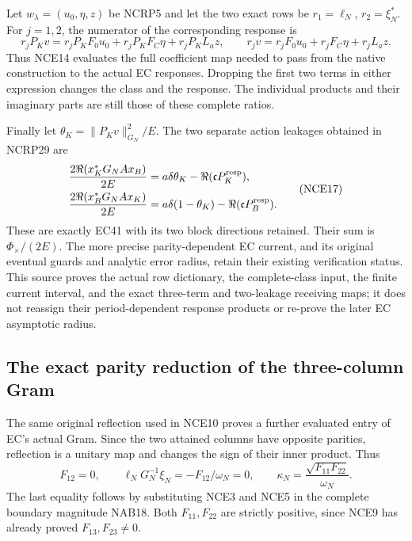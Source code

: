 Let $w_\lambda=(u_0,\eta,z)$ be NCRP5 and let the two exact rows be
$r_1=\ell_N$, $r_2=\xi_N^*$.
For $j=1,2$, the numerator of the corresponding response is
\[
 r_jP_Kv
    =r_jP_KF_0u_0+r_jP_KF_C\eta+r_jP_KL_az,
 \qquad
 r_jv=r_jF_0u_0+r_jF_C\eta+r_jL_az .
 \tag{NCE16}
\]
Thus NCE14 evaluates the full coefficient map needed to pass from
the native construction to the actual EC responses. Dropping the
first two terms in either expression changes the class and the
response. The individual products and their imaginary parts are
still those of these complete ratios.

Finally let $\theta_K=\|P_Kv\|_{G_N}^2/E$. The two separate action
leakages obtained in NCRP29 are
\[
 \begin{split}
 \frac{2\Re(x_K^*G_NAx_B)}{2E}
       &=a\delta\theta_K-\Re(\mathfrak c P_K^{\rm resp}),\\
 \frac{2\Re(x_B^*G_NAx_K)}{2E}
       &=a\delta(1-\theta_K)-\Re(\mathfrak c P_B^{\rm resp}).
 \end{split}                                                     \tag{NCE17}
\]
These are exactly EC41 with its two block directions retained.
Their sum is $\Phi_\times/(2E)$.
The more precise parity-dependent EC current, and its original
eventual guards and analytic error radius, retain their existing
verification status. This source proves the actual row dictionary,
the complete-class input, the finite current interval, and the
exact three-term and two-leakage receiving maps; it does not
reassign their period-dependent response products or re-prove
the later EC asymptotic radius.

\subsection{The exact parity reduction of the three-column Gram}

The same original reflection used in NCE10 proves a further evaluated
entry of EC's actual Gram. Since the two attained columns have opposite
parities, reflection is a unitary map and changes the sign of their
inner product. Thus
\[
 F_{12}=0,\qquad
 \ell_NG_N^{-1}\xi_N=-F_{12}/\omega_N=0,\qquad
 \kappa_N=\frac{\sqrt{F_{11}F_{22}}}{\omega_N}.
 \tag{NCE18}
\]
The last equality follows by substituting NCE3 and NCE5 in the complete
boundary magnitude NAB18. Both $F_{11},F_{22}$ are strictly positive,
since NCE9 has already proved $F_{13},F_{23}\ne0$.

